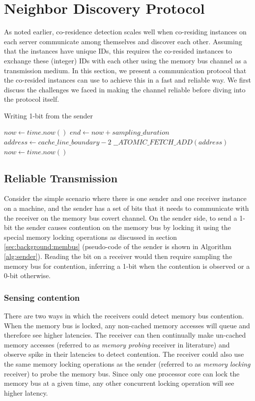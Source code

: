 \section{Neighbor Discovery Protocol}
\label{sec:technique}
 
As noted earlier, co-residence detection scales well when co-residing 
instances on each server communicate among themselves and discover each other. 
Assuming that the instances 
have unique IDs, this requires the co-resided instances to exchange these (integer) IDs with each other using the memory bus channel as a transmission medium. In this section, we present a communication protocol that the co-resided instances can use to achieve this in a fast and reliable way. We first discuss the challenges we faced in making the 
channel reliable before diving into the protocol itself.

\begin{algorithm}[!t]
\caption{Writing 1-bit from the sender}
\label{alg:sender}
\begin{algorithmic}
\STATE $now \leftarrow  time.now()$
\STATE $end \leftarrow now + sampling\_duration$
\STATE $address \leftarrow cache\_line\_boundary-2$
    \STATE $\_\_ATOMIC\_FETCH\_ADD(address)$
    \STATE $now \leftarrow  time.now()$
\ENDWHILE
\end{algorithmic}
\end{algorithm}

\subsection{Reliable Transmission}
Consider the simple scenario where there is one sender and one receiver 
instance on a machine, and the sender has a set of bits that it needs to communicate 
with the receiver on the memory bus covert channel. On the sender side, to send 
a 1-bit the sender causes contention on the memory bus by locking it using
the special memory locking operations as discussed in section \ref{sec:background:membus} 
(pseudo-code of the sender is shown in Algorithm \ref{alg:sender}).
 Reading the bit on a 
receiver would then require sampling the memory bus for contention, 
inferring a 1-bit when the contention is observed or a 0-bit otherwise.

\subsubsection{Sensing contention} 
There are two ways in which the receivers could detect memory bus contention. 
When the memory bus is locked, any non-cached memory 
accesses will queue and therefore see higher latencies. The receiver can 
then continually make un-cached memory accesses (referred to 
as \textit{memory probing} receiver in literature\cite{varadarajan2015}) and 
observe spike in their latencies to detect contention.
The receiver could also use the same memory locking 
operations as the sender (referred to as \textit{memory locking} receiver) to 
probe the memory bus. 
Since only one processor core can lock the memory bus at a given time, any other 
concurrent locking operation will see higher latency. 

